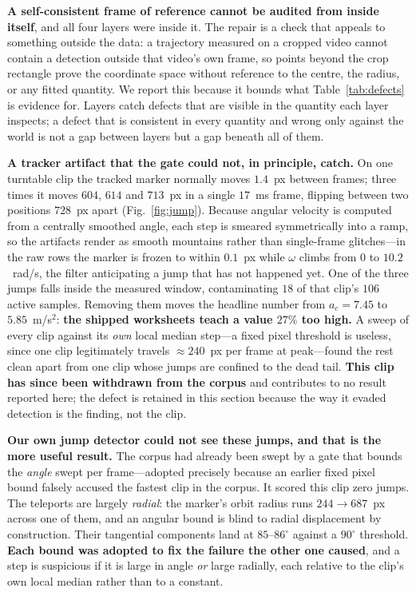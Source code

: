 \documentclass[conference]{IEEEtran}
\newcommand{\ac}{a_{c}}
\begin{document}
\textbf{A self-consistent frame of reference cannot be audited from inside
itself}, and all four layers were inside it. The repair is a check that appeals
to something outside the data: a trajectory measured on a cropped video cannot
contain a detection outside that video's own frame, so points beyond the crop
rectangle prove the coordinate space without reference to the centre, the
radius, or any fitted quantity. We report this because it bounds what
Table~\ref{tab:defects} is evidence for. Layers catch defects that are visible
in the quantity each layer inspects; a defect that is consistent in every
quantity and wrong only against the world is not a gap between layers but a
gap beneath all of them.

\textbf{A tracker artifact that the gate could not, in principle, catch.} On
one turntable clip the tracked marker normally moves $1.4$~px between frames;
three times it moves $604$, $614$ and $713$~px in a single $17$~ms frame,
flipping between two positions $728$~px apart (Fig.~\ref{fig:jump}). Because
angular velocity is computed from a centrally smoothed angle, each step is
smeared symmetrically into a ramp, so the artifacts render as smooth mountains
rather than single-frame glitches---in the raw rows the marker is frozen to
within $0.1$~px while $\omega$ climbs from $0$ to $10.2$~rad/s, the filter
anticipating a jump that has not happened yet. One of the three jumps falls
inside the measured window, contaminating $18$ of that clip's $106$ active
samples. Removing them moves the headline number from
$\ac = 7.45$ to $5.85$~m/s$^{2}$: \textbf{the shipped worksheets teach a value
$27\%$ too high.} A sweep of every clip against its \emph{own} local median
step---a fixed pixel threshold is useless, since one clip legitimately travels
$\approx240$~px per frame at peak---found the rest clean apart from one clip
whose jumps are confined to the dead tail. \textbf{This clip has since been
withdrawn from the corpus} and contributes to no result reported here; the
defect is retained in this section because the way it evaded detection is the
finding, not the clip.

\textbf{Our own jump detector could not see these jumps, and that is the more
useful result.} The corpus had already been swept by a gate that bounds the
\emph{angle} swept per frame---adopted precisely because an earlier fixed
pixel bound falsely accused the fastest clip in the corpus. It scored this clip
zero jumps. The teleports are largely \emph{radial}: the marker's orbit radius
runs $244 \rightarrow 687$~px across one of them, and an angular bound is blind
to radial displacement by construction. Their tangential components land at
$85$--$86^{\circ}$ against a $90^{\circ}$ threshold. \textbf{Each bound was
adopted to fix the failure the other one caused}, and a step is suspicious if it
is large in angle \emph{or} large radially, each relative to the clip's own
local median rather than to a constant.
\end{document}

